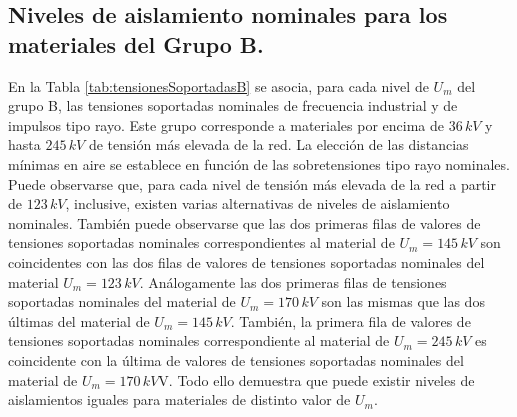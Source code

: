         \subsection{Niveles de aislamiento nominales para los materiales del Grupo B.}
            En la Tabla \ref{tab:tensionesSoportadasB} se asocia, para cada nivel de $U_\textit{m}$ del grupo B, las tensiones soportadas nominales de frecuencia industrial y de impulsos tipo rayo. Este grupo corresponde a materiales por encima de $36\,\textit{kV}$ y hasta $245\,\textit{kV}$ de tensión más elevada de la red. La elección de las distancias mínimas en aire se establece en función de las sobretensiones tipo rayo nominales. Puede observarse que, para cada nivel de tensión más elevada de la red a partir de $123\,\textit{kV}$, inclusive, existen varias alternativas de niveles de aislamiento nominales. También puede observarse que las dos primeras filas de valores de tensiones soportadas nominales correspondientes al material de $U_\textit{m}=145\,\textit{kV}$ son coincidentes con las dos filas de valores de tensiones soportadas nominales del material $U_\textit{m}=123\,\textit{kV}$. Análogamente las dos primeras filas de tensiones soportadas nominales del material de $U_\textit{m}=170\,\textit{kV}$ son las mismas que las dos últimas del material de $U_\textit{m}=145\,\textit{kV}$. También, la primera fila de valores de tensiones soportadas nominales correspondiente al material de $U_\textit{m}=245\,\textit{kV}$ es coincidente con la última de valores de tensiones soportadas nominales del material de $U_\textit{m}=170\,\textit{kV}$V. Todo ello demuestra que puede existir niveles de aislamientos iguales para materiales de distinto valor de $U_\textit{m}$.\newline

